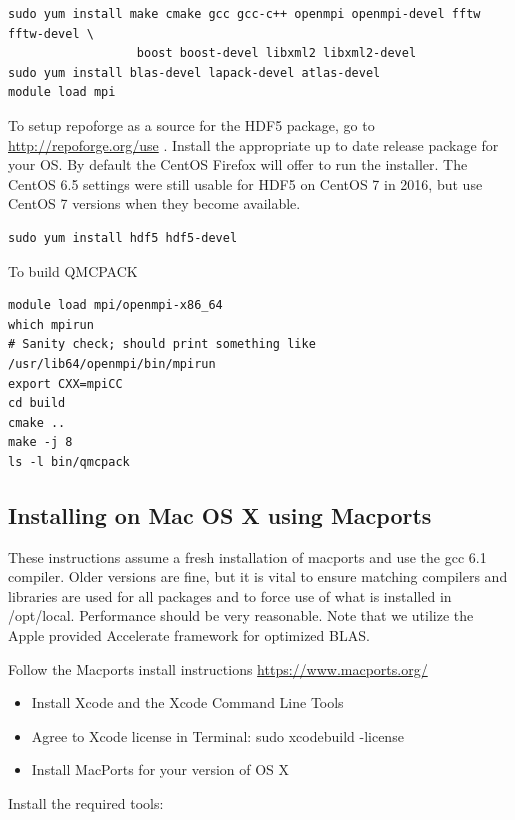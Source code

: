 \verbatimfont{\footnotesize}
\begin{verbatim}
sudo yum install make cmake gcc gcc-c++ openmpi openmpi-devel fftw fftw-devel \
                  boost boost-devel libxml2 libxml2-devel
sudo yum install blas-devel lapack-devel atlas-devel
module load mpi
\end{verbatim}

To setup repoforge as a source for the HDF5 package, go to
\url{http://repoforge.org/use} . Install the appropriate up to date
release package for your OS. By default the CentOS Firefox will offer
to run the installer. The CentOS 6.5 settings were still usable for HDF5 on
CentOS 7 in 2016, but use CentOS 7 versions when they become
available.

\verbatimfont{\footnotesize}
\begin{verbatim}
sudo yum install hdf5 hdf5-devel
\end{verbatim}

To build QMCPACK
\verbatimfont{\footnotesize}
\begin{verbatim}
module load mpi/openmpi-x86_64
which mpirun
# Sanity check; should print something like   /usr/lib64/openmpi/bin/mpirun
export CXX=mpiCC
cd build
cmake ..
make -j 8
ls -l bin/qmcpack
\end{verbatim}

\subsection{Installing on Mac OS X using Macports}
These instructions assume a fresh installation of macports
and use the gcc 6.1 compiler. Older versions are fine, but it is vital to ensure
matching compilers and libraries are used for all
packages and to force use of what is installed in /opt/local.  Performance should be very reasonable.
Note that we utilize the Apple provided Accelerate framework for
optimized BLAS.

Follow the Macports install instructions \url{https://www.macports.org/}

\begin{itemize}
\item Install Xcode and the Xcode Command Line Tools
\item Agree to Xcode license in Terminal: sudo xcodebuild -license
\item Install MacPorts for your version of OS X
\end{itemize}


Install the required tools:


